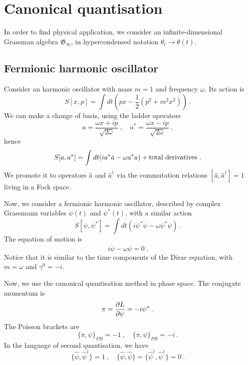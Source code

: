 \chapter{Canonical quantisation} 

    In order to find physical application, we consider an infinite-dimensional Grassman algebra $\mathfrak G_\infty$, in hypercondensed notation $\theta_i \rightarrow \theta (t)$. 

\section{Fermionic harmonic oscillator}

    Consider an harmonic oscillator with mass $m = 1$ and frequency $\omega$. Its action is 
    \begin{equation*}
        S[x, p] = \int dt (p \dot x - \frac{1}{2} (p^2 + m^2 x^2)) ~.
    \end{equation*}
    We can make a change of basis, using the ladder operators 
    \begin{equation*}
        a = \frac{\omega x + i p}{\sqrt{2 \omega}} ~, \quad a^* = \frac{\omega x - i p}{\sqrt{2 \omega}} ~, 
    \end{equation*}
    hence 
    \begin{equation*}
        S[a, a^*] = \int dt (i a^* \dot a - \omega a^* a) + \textnormal{total derivatives} ~.
    \end{equation*}
    We promote it to operators $\hat a$ and $\hat a^\dagger$ via the commutation relations $[\hat a, \hat a^\dagger] = 1$ living in a Fock space. 

    Now, we consider a fermionic harmonic oscillator, described by complex Grassmann variables $\psi(t)$ and $\psi^*(t)$, with a similar action 
    \begin{equation*}
        S[\psi, \psi^*] = \int dt (i \psi^* \dot \psi - \omega \psi^* \psi)  ~.
    \end{equation*}
    The equation of motion is 
    \begin{equation*}
        i \dot \psi - \omega \psi = 0 ~.
    \end{equation*}
    Notice that it is similar to the time components of the Dirac equation, with $m = \omega$ and $\gamma^0 = - i$.

    Now, we use the canonical quantisation method in phase space. The conjugate momentum is 
    \begin{equation*}
        \pi = \frac{\partial L}{\partial\psi} = - i \psi^* ~.
    \end{equation*}
    The Poisson brackets are 
    \begin{equation*}
        \{\pi, \psi\}_{PB} = - 1 ~, \quad \{\pi, \psi\}_{PB} = - i ~.
    \end{equation*}
    In the language of second quantisation, we have  
    \begin{equation*}
        \{\hat \psi, \hat \psi^\dagger\} = 1 ~, \quad \{\hat \psi, \hat \psi\} = \{\hat \psi^\dagger, \hat \psi^\dagger\} = 0 ~.
    \end{equation*}

